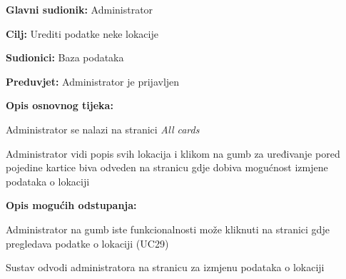 					\noindent {}
					\begin{packed_item}
	
						\item \textbf{Glavni sudionik: }Administrator
						\item  \textbf{Cilj:} Urediti podatke neke lokacije
						\item  \textbf{Sudionici:} Baza podataka
						\item  \textbf{Preduvjet:} Administrator je prijavljen
						\item  \textbf{Opis osnovnog tijeka:}
						
						\item[] \begin{packed_enum}
	
							\item Administrator se nalazi na stranici \textit{All cards}
							\item Administrator vidi popis svih lokacija i klikom na gumb za uređivanje pored pojedine kartice biva odveden na stranicu gdje dobiva mogućnost izmjene podataka o lokaciji
							
						\end{packed_enum}
						
						\item  \textbf{Opis mogućih odstupanja:}
						\item[] \begin{packed_item}
	
							\item[2.a] Administrator na gumb iste funkcionalnosti može kliknuti na stranici gdje pregledava podatke o lokaciji (UC29)
							\item[] \begin{packed_enum}
								
								\item Sustav odvodi administratora na stranicu za izmjenu podataka o lokaciji
								
							\end{packed_enum}
						\end{packed_item}
					\end{packed_item}
					
